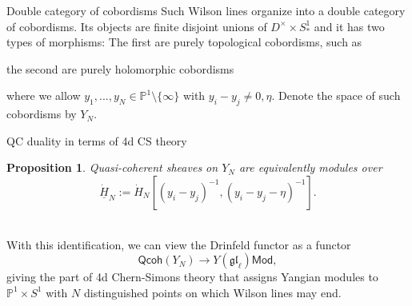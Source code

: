 \documentclass[11pt]{beamer}
\newtheorem{prop}[theorem]{Proposition}
\theoremstyle{remark}
\theoremstyle{remark}
\newcommand{\C}{\mathbb{C}}
\renewcommand{\P}{\mathbb{P}}
\begin{document}
\begin{frame}[fragile]{Double category of cobordisms}
Such Wilson lines organize into a double category of cobordisms. Its objects are finite disjoint unions of $D^\times \times S_*^1$ and it has two types of morphisms: The first are purely topological cobordisms, such as
\begin{center}
\end{center}
the second are purely holomorphic cobordisms
\begin{center}
\end{center}
where we allow $y_1,...,y_N \in \P^1 \setminus \{ \infty \}$ with $y_i-y_j \neq 0,\eta$. Denote the space of such cobordisms by $Y_N$.
\end{frame}

\begin{frame}{QC duality in terms of 4d CS theory}
\begin{prop}
Quasi-coherent sheaves on $Y_N$ are equivalently modules over
\begin{equation*}
\underline{\dot H}_N := \dot H_N[(y_i-y_j)^{-1},(y_i-y_j-\eta)^{-1}].
\end{equation*}
\end{prop}
~\\
With this identification, we can view the Drinfeld functor as a functor
\begin{equation*}
\mathsf{Qcoh}(Y_N) \to Y(\mathfrak{gl}_\ell)\mathsf{Mod},
\end{equation*}
giving the part of 4d Chern-Simons theory that assigns Yangian modules to $\P^1 \times S^1$ with $N$ distinguished points on which Wilson lines may end.
\end{frame}
\end{document}
